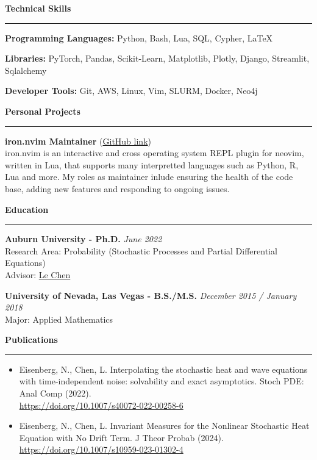 \documentclass[12pt]{article}
\begin{document}
\textbf{\Large Technical Skills} \vspace{.2em} \hrule

\textbf{Programming Languages:} Python, Bash, Lua, SQL, Cypher, \LaTeX

\vspace{-.5em}

\textbf{Libraries:} PyTorch, Pandas, Scikit-Learn, Matplotlib, Plotly, Django,
Streamlit, Sqlalchemy

\vspace{-.5em}

\textbf{Developer Tools:} Git, AWS, Linux, Vim, SLURM, Docker, Neo4j


\textbf{\Large Personal Projects} \vspace{.2em} \hrule

\textbf{iron.nvim Maintainer}
(\href{https://github.com/Vigemus/iron.nvim}{GitHub link})\\
iron.nvim is an interactive and cross operating system REPL plugin for neovim,
written in Lua, that supports many interpretted languages such as Python, R,
Lua and more. My roles as maintainer inlude ensuring the health of the code
base, adding new features and responding to ongoing issues.

\textbf{\Large Education} \vspace{.2em} \hrule

\textbf{Auburn University - Ph.D.} \hfill \textit{June 2022} \\
Research Area: Probability (Stochastic Processes and Partial Differential Equations) \\
Advisor: \href{http://webhome.auburn.edu/~lzc0090/}{Le Chen}

\textbf{University of Nevada, Las Vegas - B.S./M.S.} \hfill
\textit{December 2015 / January 2018} \\
Major: Applied Mathematics

\textbf{\Large Publications} \vspace{.3em} \hrule

\begin{itemize}[leftmargin=*]
	\item[1:] Eisenberg, N., Chen, L. Interpolating
		the stochastic heat and wave equations with time-independent noise:
		solvability and exact asymptotics. Stoch PDE: Anal Comp (2022).
		\\\href{https://doi.org/10.1007/s40072-022-00258-6}{https://doi.org/10.1007/s40072-022-00258-6}

	\item[2:]  Eisenberg, N., Chen, L. Invariant Measures for the Nonlinear
		Stochastic Heat Equation with No Drift Term. J Theor Probab (2024).
		\href{https://doi.org/10.1007/s10959-023-01302-4}{https://doi.org/10.1007/s10959-023-01302-4}

\end{itemize}
\end{document}
